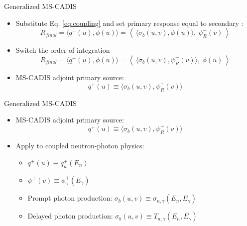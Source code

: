 \documentclass{beamer}
\begin{document}
\begin{frame}{Generalized MS-CADIS}
\begin{itemize}
\item{Substitute Eq. \ref{eq:coupling} and set primary response equal to secondary :}
\begin{equation}
	R_{final} = \langle q^+(u), \phi(u) \rangle
	=\left \langle\  \langle \sigma_b(u,v) , \phi(u) \rangle,\
	\psi_R^{+}(v) \ \right\rangle
\end{equation}
\pause
	\item{Switch the order of integration}
\begin{equation}\label{eq:pseudo-response}
	R_{final} = \langle q^+(u), \phi(u) \rangle
	=\left \langle \ \langle \sigma_b(u,v) , \psi_R^{+}(v) \rangle,\
	\phi(u) \ \right\rangle
\end{equation}
		\vspace{0.2cm}
\pause
\item{MS-CADIS adjoint primary source:}
\begin{equation}
  q^{+}(u) \equiv \langle \sigma_b(u,v) , \psi_R^{+}(v) \rangle
\end{equation}
\end{itemize}
\end{frame}

\begin{frame}{Generalized MS-CADIS}
\begin{itemize}
\item{MS-CADIS adjoint primary source:}
\begin{equation}
  q^{+}(u) \equiv \langle \sigma_b(u,v) , \psi_R^{+}(v) \rangle
\end{equation}
\item{Apply to coupled neutron-photon physics:}
	\begin{itemize}
		\item{$q^+(u) \equiv q_n^+(E_n)$}
			\vspace{0.1cm}
		\item{$\psi^+(v) \equiv \phi_{\gamma}^+(E_{\gamma})$}
			\vspace{0.1cm}
	\item{Prompt photon production: $\sigma_b(u,v) \equiv \sigma_{n,\gamma}(E_n,
	E_{\gamma})$}
			\vspace{0.1cm}
	\item{Delayed photon production: $\sigma_b(u,v) \equiv 
	T_{n,\gamma}(E_n,E_{\gamma})$}
	\end{itemize}

\end{itemize}
\end{frame}
\end{document}
